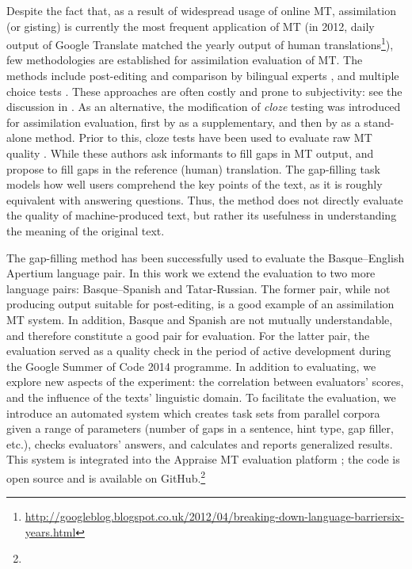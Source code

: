 \documentclass[11pt]{article}
\newcommand{\comment}[1]{}
\newcommand{\blankout}[1]{\phantom{#1}} %
\begin{document}
Despite the fact that, as a result of widespread usage of online MT, assimilation (or gisting) is currently the most frequent application of MT (in 2012, daily output of Google Translate matched the yearly output of human translations\footnote{\url{http://googleblog.blogspot.co.uk/2012/04/breaking-down-language-barriersix-years.html}}), few methodologies are established for assimilation evaluation of MT. The methods include post-editing and comparison by bilingual experts \citep{ginesti09},\comment{MLF: should we also cite the original WMT reference cited by Ginestí et al.?} and multiple choice tests \citep{jones07,trosterud12}. These approaches are often costly and prone to subjectivity: see the discussion in \cite{oregan13}. As an alternative, the modification of \emph{cloze}\comment{\emph{cloze} stands for \emph{closure}.} testing \citep{taylor53} was introduced for assimilation evaluation, first by \citet{trosterud12} as a supplementary, and then by \citet{oregan13} as a stand-alone method. Prior to this, cloze tests have been used to evaluate raw MT quality \citep{vanslype79,somers00}. While these authors ask informants to fill gaps in MT output, \citet{trosterud12} and \citet{oregan13} propose to fill gaps in the reference (human) translation. The gap-filling task models how well users comprehend the key points of the text, as it is roughly equivalent with answering questions. Thus, the method does not directly evaluate the quality of machine-produced text, but rather its usefulness in understanding the meaning of the original text. 

The gap-filling method has been successfully used to evaluate the Basque--English Apertium language pair. In this work we extend the evaluation to two more language pairs: Basque--Spanish and Tatar-Russian. The former pair, while not producing output suitable for post-editing, is a good example of an assimilation MT system. In addition, Basque and Spanish are not mutually understandable, and therefore constitute a good pair for evaluation. For the latter pair, the evaluation served as a quality check in the period of active development during the Google Summer of Code 2014 programme. In addition to evaluating, we explore new aspects of the experiment: the correlation between evaluators' scores, and the influence of the texts' linguistic domain. To facilitate the evaluation, we introduce an automated system which creates task sets from parallel corpora given a range of parameters (number of gaps in a sentence, hint type, gap filler,\comment{MLF: gap filler or gap marker?} \comment{EA: well, initially we had questions with lemmas in place of gaps, and also multiple choice questions where answer options got generated automatically. This is not used in this evaluation, but it's still in the toolkit. Should I remove?} etc.), checks evaluators' answers, and calculates and reports generalized results. This system is integrated into the Appraise MT evaluation platform \citep{federmann12}; the code is open source and is available on GitHub.\footnote{\blankout{\url{https://github.com/Sereni/Appraise}}}
\end{document}
